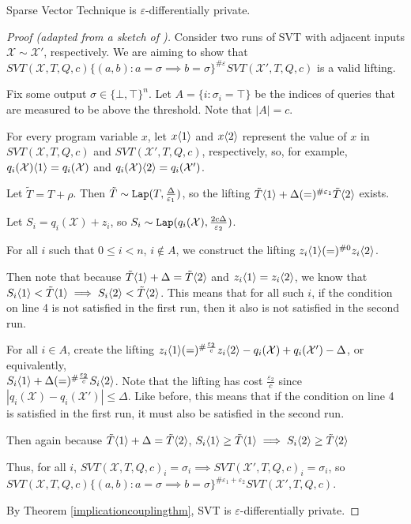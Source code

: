 \begin{thm}
    Sparse Vector Technique is $\varepsilon$-differentially private. 
\end{thm}

\begin{proof}[Proof (adapted from a sketch of \cite{bartheProvingDifferentialPrivacy2016})]
    Consider two runs of SVT with adjacent inputs $\mathcal{X}\sim\mathcal{X}'$, respectively. We are aiming to show that $SVT(\mathcal{X}, T, Q, c)\{(a, b): a=\sigma \implies b=\sigma\}^{\#\varepsilon}SVT(\mathcal{X}', T, Q, c)$ is a valid lifting. 

    Fix some output $\sigma \in \{\bot, \top\}^n$. Let $A = \{i:\sigma_i = \top\}$ be the indices of queries that are measured to be above the threshold. Note that $|A| = c$. 
    
    For every program variable $x$, let $x\langle1 \rangle$ and $x\langle2 \rangle$ represent the value of $x$ in $SVT(\mathcal{X}, T, Q, c)$ and $SVT(\mathcal{X}', T, Q, c)$, respectively, so, for example, $q_i(\mathcal{X})\langle1 \rangle = q_i(\mathcal{X})$ and $q_i(\mathcal{X})\langle2 \rangle = q_i(\mathcal{X}')$. 

    Let $\tilde{T}=T + \rho$. Then $\tilde{T} \sim \texttt{Lap}(T, \frac{\Delta}{\varepsilon_1})$, so the lifting $\tilde{T}\langle1 \rangle +\Delta (=)^{\#\varepsilon_1}\tilde{T}\langle2 \rangle$ exists. 

    Let $S_i = q_i(\mathcal{X}) + z_i$, so $S_i \sim\texttt{Lap}(q_i(\mathcal{X}), \frac{2c\Delta}{\varepsilon_2})$.

    For all $i$ such that $0\leq i < n$, $i\notin A$, we construct the lifting $z_i\langle1 \rangle (=)^{\#0}z_i\langle2 \rangle$. 

    Then note that because $\tilde{T}\langle1 \rangle+\Delta = \tilde{T}\langle2 \rangle$ and $z_i\langle1 \rangle = z_i \langle2 \rangle$, we know that $S_i\langle1 \rangle < \tilde{T}\langle1 \rangle \implies S_i\langle2 \rangle < \tilde{T}\langle2 \rangle$. This means that for all such $i$, if the condition on line 4 is not satisfied in the first run, then it also is not satisfied in the second run.

    For all $i\in A$, create the lifting $z_i\langle1 \rangle(=)^{\#\frac{\varepsilon_2}{c}}z_i\langle2 \rangle - q_i(\mathcal{X})+q_i(\mathcal{X}')-\Delta$, or equivalently, \\$S_i\langle1 \rangle +\Delta (=)^{\#\frac{\varepsilon_2}{c}} S_i\langle2 \rangle$. Note that the lifting has cost $\frac{\varepsilon_2}{c}$ since $|q_i(\mathcal{X})-q_i(\mathcal{X}')|\leq \Delta$. Like before, this means that if the condition on line 4 is satisfied in the first run, it must also be satisfied in the second run. 

    Then again because $\tilde{T}\langle1 \rangle +\Delta = \tilde{T}\langle2 \rangle$, $S_i\langle1 \rangle \geq \tilde{T}\langle1 \rangle \implies S_i\langle2 \rangle \geq \tilde{T}\langle2 \rangle$

    Thus, for all $i$, $SVT(\mathcal{X}, T, Q, c)_i = \sigma_i \implies SVT(\mathcal{X}', T, Q, c)_i = \sigma_i$, so $SVT(\mathcal{X}, T, Q, c)\{(a, b): a=\sigma \implies b=\sigma\}^{\#\varepsilon_1+\varepsilon_2}SVT(\mathcal{X}', T, Q, c)$.

    By Theorem \ref{implicationcouplingthm}, SVT is $\varepsilon$-differentially private. 
\end{proof}
